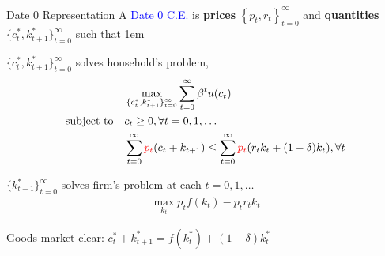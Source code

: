\documentclass[11pt,aspectratio=43,usenames,dvipsnames]{beamer}
\newcommand{\red}[1]{\textcolor{red}{#1}}
\newcommand{\blue}[1]{\textcolor{blue}{#1}}
\let\oldenumerate=\enumerate
\let\endoldenumerate=\endenumerate
\renewenvironment{enumerate}{\oldenumerate \itemsep1em}{ \endoldenumerate}
\theoremstyle{definition}
\begin{document}
\begin{frame}{Date 0 Representation}
\label{slide:Date_0_Representation}
A \blue{Date 0 C.E.} is \textbf{prices} $ \left\{p_{t}, r_{t}\right\}_{t=0}^{\infty} $ and \textbf{quantities} $ \{c_{t}^{*}, k_{t+1}^{*}\}_{t=0}^{\infty} $ such that
\begin{enumerate}
    \item $\{c_{t}^{*}, k_{t+1}^{*}\}_{t=0}^{\infty}$ solves household's problem,
     \begin{align}
             & \max_{\{c_{t}^{*}, k_{t+1}^{*}\}_{t=0}^{\infty}} \sum_{t=0}^{\infty} \beta^{t} u(c_{t})
         \\
         \text{subject to} \quad
             & c_{t} \ge 0, \forall t = 0, 1, \ldots
         \\
             & \sum_{t=0}^{\infty} \red{p_{t}} (c_{t} + k_{t+1}) \le \sum_{t=0}^{\infty} \red{p_{t}} (r_{t} k_{t} + (1-\delta)k_{t}), \forall t
     \end{align}
    \item $\{k_{t+1}^{*}\}_{t=0}^{\infty}$ solves firm's problem at each $ t = 0, 1, \ldots $
    \begin{align}
        \max_{k_{t}} p_{t} f(k_{t}) - p_{t}r_{t}k_{t}
    \end{align}
    \item Goods market clear: $ c_{t}^{*} + k_{t+1}^{*} = f(k_{t}^{*}) + (1-\delta) k_{t}^{*} $
\end{enumerate}

\end{frame}
\end{document}
